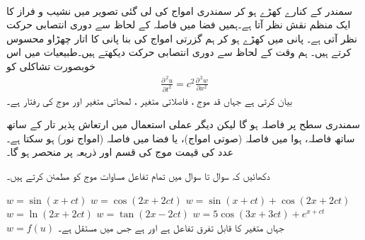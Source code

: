 \\
سمندر  کے کنارے کھڑے  ہو کر سمندری امواج کی لی گئی  تصویر  میں نشیب و فراز کا   ایک منظم نقش نظر آتا ہے۔ہمیں  فضا میں  فاصلہ کے لحاظ سے   دوری انتصابی حرکت نظر آتی ہے۔ پانی میں کھڑے ہو کر ہم گزرتی امواج کی بنا پانی کا اتار چھڑاو محسوس کرتے ہیں۔ ہم وقت کے لحاظ سے دوری انتصابی حرکت  دیکھتے ہیں۔طبیعیات  میں اس خوبصورت   تشاکلی کو 
\begin{align}
\frac{\partial^{\,2}u}{\partial t^2}=c^2\frac{\partial ^{\,2}w}{\partial x^2}
\end{align}
بیان کرتی ہے جہاں  قد موج  ، فاصلاتی متغیر  ، لمحاتی متغیر  اور موج کی رفتار    ہے۔ 

سمندری سطح پر فاصلہ  ہو گا لیکن دیگر عملی استعمال میں   ارتعاش پذیر  تار کے ساتھ ساتھ  فاصلہ، ہوا میں فاصلہ (صوتی امواج)، یا فضا میں فاصلہ  (امواج نور)  ہو سکتا ہے۔  عدد  کی قیمت موج کی قسم اور  ذریعہ پر منحصر ہو  گا۔

دکھائیں کہ سوال  تا سوال   میں تمام  تفاعل مساوات موج کو مطمئن کرتے ہیں۔ 

$w=\sin(x+ct)$
$w=\cos(2x+2ct)$
$w=\sin(x+ct)+\cos(2x+2ct)$
$w=\ln(2x+2ct)$
$w=\tan(2x-2ct)$
$w=5\cos(3x+3ct)+e^{x+ct}$
$w=f(u)$
جہاں  متغیر  کا قابل تفرق تفاعل ہے اور  ہے جس میں  مستقل ہے۔
